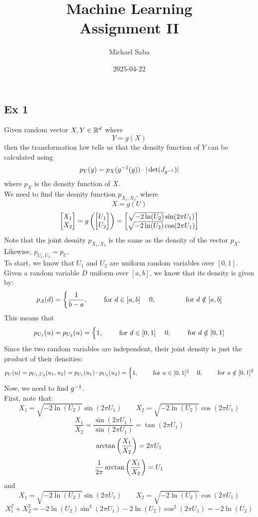 \documentclass[12pt]{article}
\title{%
    \Huge Machine Learning \\
    \Large Assignment II
}
\date{2025-04-22}
\author{Michael Saba}
\begin{document}
\maketitle
\newpage
\setlength{\parindent}{0pt}

\subsection*{Ex 1}

Given random vector $X, Y \in \mathbb{R}^d$ where
\[ Y = g(X) \]
then the transformation law tells us that
the density function of $Y$ can be calculated
using
\[ p_Y(y) = p_X(g^{-1} (y)) \cdot 
| \det(J_{g^{-1}}) | \]
where $p_X$ is the density function of $X$. \\
We need to find the desnity function $p_{X_1, X_2}$,
where
\[ X = g(U) \]
\[ \bmat{{X_1} \\ {X_2}} = g\para{\bmat{{U_1} \\ {U_2}}}
= \bmat{
{\sqrt{-2\ln(U_2)}\sin(2\pi U_1) \vspace{10pt}} \\
{\sqrt{-2\ln(U_2)}\cos(2\pi U_1)}}\]
Note that the joint desnity $p_{X_1, X_2}$
is the same as the density of the vector $p_X$.
Likewise, $p_{U_1, U_2} = p_U$. \\ 
To start, we know that $U_1$ and $U_2$
are uniform random variables over $[0, 1]$. \\
Given a random variable $D$ uniform over $[a, b]$,
we know that its density is given by:
\[ p_A(d) = \begin{cases} \dfrac{1}{b-a},
\qquad \text{ for } d \in [a, b] \end{cases}
{ 0, \qquad \qquad \text{ for } d \notin [a, b]} \]
This means that 
\[ p_{U_1}(u) = p_{U_2}(u) = 
\begin{cases} 1, \qquad \text{ for } d \in [0, 1] \end{cases}
{ 0, \qquad \text{ for } d \notin [0, 1]} \]
Since the two random variables are independent,
their joint density is just the product
of their densities:
\[ p_U(u) = p_{U_1, U_2}(u_1, u_2) =
p_{U_1}(u_1) \cdot p_{U_2}(u_2) = 
\begin{cases} 1, \qquad \text{ for } u \in [0, 1]^2 \end{cases}
{ 0, \qquad \text{ for } u \notin [0, 1]^2} \]
Now, we need to find $g^{-1}$. \\
First, note that:
\[ X_1 = \sqrt{-2\ln(U_2)}\sin(2\pi U_1)
\qquad X_2 = \sqrt{-2\ln(U_2)}\cos(2\pi U_1) \]
\[ \dfrac{X_1}{X_2} = 
\dfrac{\sin(2\pi U_1)}{\sin(2\pi U_1)}
= \tan(2\pi U_1) \]
\[ \arctan\left( \dfrac{X_1}{X_2} \right) = 2\pi U_1 \]
\[ \dfrac{1}{2\pi}\arctan\left( \dfrac{X_1}{X_2} \right) 
= U_1 \]
and
\[ X_1 = \sqrt{-2\ln(U_2)}\sin(2\pi U_1)
\qquad X_2 = \sqrt{-2\ln(U_2)}\cos(2\pi U_1) \]
\[ X_1^2 + X_2^2 = 
-2\ln(U_2)\sin^2(2\pi U_1) 
-2\ln(U_2)\cos^2(2\pi U_1)
= -2\ln(U_2) \]
\end{document}
